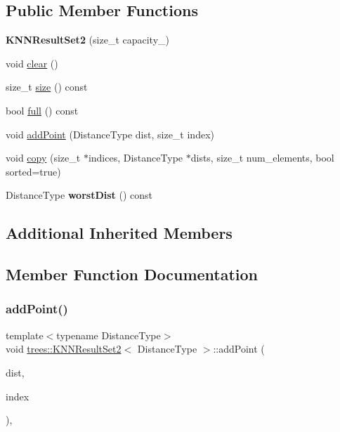 \subsection*{Public Member Functions}
\begin{DoxyCompactItemize}
\item 
\mbox{\label{classtrees_1_1_k_n_n_result_set2_ab87a04c5ee4d4da391452bf4023c100f}} 
{\bfseries K\+N\+N\+Result\+Set2} (size\+\_\+t capacity\+\_\+)
\item 
void \hyperlink{classtrees_1_1_k_n_n_result_set2_aedf33272f0b7247f3099e37129cf5aaf}{clear} ()
\item 
size\+\_\+t \hyperlink{classtrees_1_1_k_n_n_result_set2_a785fa83af6d1b915443a0b9806c26d82}{size} () const
\item 
bool \hyperlink{classtrees_1_1_k_n_n_result_set2_a903927839600a5871dbecef08002bd29}{full} () const
\item 
void \hyperlink{classtrees_1_1_k_n_n_result_set2_ae67f111b6e4fd6ccdb262552b5881ccc}{add\+Point} (Distance\+Type dist, size\+\_\+t index)
\item 
void \hyperlink{classtrees_1_1_k_n_n_result_set2_aeb8e99886bd18708719c90f22a8d1956}{copy} (size\+\_\+t $\ast$indices, Distance\+Type $\ast$dists, size\+\_\+t num\+\_\+elements, bool sorted=true)
\item 
\mbox{\label{classtrees_1_1_k_n_n_result_set2_ae5c43b1692f57f7707310c611baaeb0d}} 
Distance\+Type {\bfseries worst\+Dist} () const
\end{DoxyCompactItemize}
\subsection*{Additional Inherited Members}


\subsection{Member Function Documentation}
\mbox{\label{classtrees_1_1_k_n_n_result_set2_ae67f111b6e4fd6ccdb262552b5881ccc}} 
\subsubsection{\texorpdfstring{add\+Point()}{addPoint()}}
{\footnotesize\ttfamily template$<$typename Distance\+Type$>$ \\
void \hyperlink{classtrees_1_1_k_n_n_result_set2}{trees\+::\+K\+N\+N\+Result\+Set2}$<$ Distance\+Type $>$\+::add\+Point (\begin{DoxyParamCaption}\item[{Distance\+Type}]{dist,  }\item[{size\+\_\+t}]{index }\end{DoxyParamCaption})\hspace{0.3cm}{\ttfamily [inline]}, {\ttfamily [virtual]}}

